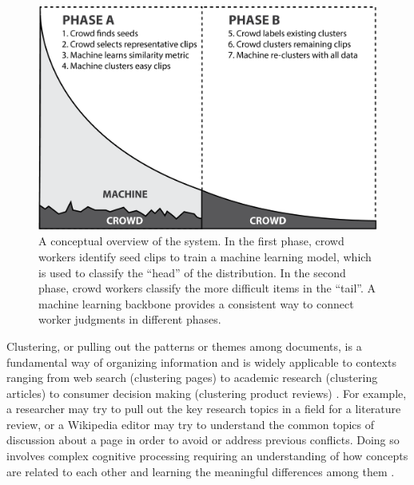 
\begin{figure}[!ht]
	\centering
	\includegraphics[width=0.6\columnwidth]{Chapters/Alloy/images/alloy_overview_01.png}
	\caption[A conceptual overview of the Alloy system.]{
		A conceptual overview of the system. In the first phase, crowd workers identify
		seed clips to train a machine learning model, which is used to classify
		the ``head'' of the distribution. In the second phase, crowd workers classify
		the more difficult items in the ``tail''. A machine learning backbone provides
		a consistent way to connect worker judgments in different phases.
	}
	\label{fig:workflow}
\end{figure}


Clustering, or pulling out the patterns or themes among documents, is a fundamental way of organizing information and is widely applicable to contexts ranging from web search (clustering pages) to academic research (clustering articles) to consumer decision making (clustering product reviews) \cite{jain1999data}.  
For example, a researcher may try to pull out the key research topics in a field for a literature review, or a Wikipedia editor may try to understand the common topics of discussion about a page in order to avoid or address previous conflicts. Doing so involves complex cognitive processing requiring an understanding of how concepts are related to each other and learning the meaningful differences among them \cite{Bellman:2003:DP:862270,kriegel2009clustering,medin1978context}. 

